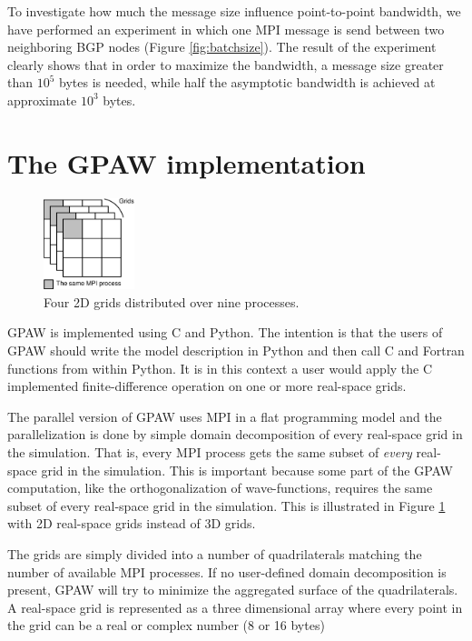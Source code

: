 \documentclass[conference]{IEEEtran}
\begin{document}
To investigate how much the message size influence point-to-point bandwidth, we have performed an experiment in which one MPI message is send between two neighboring BGP nodes (Figure \ref{fig:batchsize}). The result of the experiment clearly shows that in order to maximize the bandwidth, a message size greater than $10^5$ bytes is needed, while half the asymptotic bandwidth is achieved at approximate $10^3$ bytes.


\section{The GPAW implementation}\label{section:GPAW_impl}
\begin{figure}
 \centering
 \includegraphics[width=100px]{gfx/wavedist}
 \caption{Four 2D grids distributed over nine processes.}
 \label{fig:wavedist}
\end{figure}

GPAW is implemented using C and Python. The intention is that the users of GPAW should write the model description in Python and then call C and Fortran functions from within Python. It is in this context a user would apply the C implemented finite-difference operation on one or more real-space grids.

The parallel version of GPAW uses MPI in a flat programming model and the parallelization is done by simple domain decomposition of every real-space grid in the simulation. That is, every MPI process gets the same subset of \emph{every} real-space grid in the simulation. This is important because some part of the GPAW computation, like the orthogonalization of wave-functions, requires the same subset of every real-space grid in the simulation. This is illustrated in Figure \ref{fig:wavedist} with 2D real-space grids instead of 3D grids.

The grids are simply divided into a number of quadrilaterals matching the number of available MPI processes. If no user-defined domain decomposition is present, GPAW will try to minimize the aggregated surface of the quadrilaterals. A real-space grid is represented as a three dimensional array where every point in the grid can be a real or complex number (8 or 16 bytes)
\end{document}
